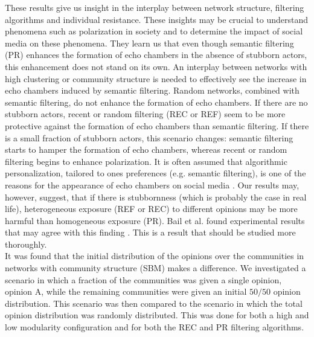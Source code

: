 \documentclass[11 pt , letterpaper , twoside , openright]{book}
\begin{document}
\newline
These results give us insight in the interplay between network structure, filtering algorithms and individual resistance. These insights may be crucial to understand phenomena such as polarization in society and to determine the impact of social media on these phenomena. They learn us that even though semantic filtering (PR) enhances the formation of echo chambers in the absence of stubborn actors, this enhancement does not stand on its own. An interplay between networks with high clustering or community structure is needed to effectively see the increase in echo chambers induced by semantic filtering. Random networks, combined with semantic filtering, do not enhance the formation of echo chambers. If there are no stubborn actors, recent or random filtering (REC or REF) seem to be more protective against the formation of echo chambers than semantic filtering. If there is a small fraction of stubborn actors, this scenario changes: semantic filtering starts to hamper the formation of echo chambers, whereas recent or random filtering begins to enhance polarization. It is often assumed that algorithmic personalization, tailored to ones preferences (e.g. semantic filtering), is one of the reasons for the appearance of echo chambers on social media \cite{Ge2020}\cite{Mohseni2018}\cite{Stark2020}. Our results may, however, suggest, that if there is stubbornness (which is probably the case in real life), heterogeneous exposure (REF or REC) to different opinions may be more harmful than homogeneous exposure (PR). Bail et al. found experimental results that may agree with this finding \cite{Bail2018}. This is a result that should be studied more thoroughly.\\
\newline
It was found that the initial distribution of the opinions over the communities in networks with community structure (SBM) makes a difference. We investigated a scenario in which a fraction of the communities was given a single opinion, opinion A, while the remaining communities were given an initial $50/50$ opinion distribution. This scenario was then compared to the scenario in which the total opinion distribution was randomly distributed. This was done for both a high and low modularity configuration and for both the REC and PR filtering algorithms. \\
\newline
\end{document}
